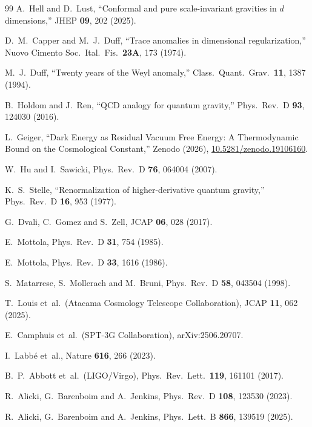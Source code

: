 \documentclass[aps,prd,twocolumn,superscriptaddress,nofootinbib]{revtex4-2}
\begin{document}
\begin{thebibliography}{99}
A.~Hell and D.~Lust,
``Conformal and pure scale-invariant gravities in $d$ dimensions,''
JHEP \textbf{09}, 202 (2025).

D.~M.~Capper and M.~J.~Duff,
``Trace anomalies in dimensional regularization,''
Nuovo Cimento Soc.\ Ital.\ Fis.\ \textbf{23A}, 173 (1974).

M.~J.~Duff,
``Twenty years of the Weyl anomaly,''
Class.\ Quant.\ Grav.\ \textbf{11}, 1387 (1994).

B.~Holdom and J.~Ren,
``QCD analogy for quantum gravity,''
Phys.\ Rev.\ D \textbf{93}, 124030 (2016).

L.~Geiger,
``Dark Energy as Residual Vacuum Free Energy: A Thermodynamic Bound on the Cosmological Constant,''
Zenodo (2026), \href{https://doi.org/10.5281/zenodo.19106160}{10.5281/zenodo.19106160}.

W.~Hu and I.~Sawicki,
Phys.\ Rev.\ D \textbf{76}, 064004 (2007).

K.~S.~Stelle,
``Renormalization of higher-derivative quantum gravity,''
Phys.\ Rev.\ D \textbf{16}, 953 (1977).

G.~Dvali, C.~Gomez and S.~Zell,
JCAP \textbf{06}, 028 (2017).

E.~Mottola,
Phys.\ Rev.\ D \textbf{31}, 754 (1985).

E.~Mottola,
Phys.\ Rev.\ D \textbf{33}, 1616 (1986).

S.~Matarrese, S.~Mollerach and M.~Bruni,
Phys.\ Rev.\ D \textbf{58}, 043504 (1998).

T.~Louis et~al.\ (Atacama Cosmology Telescope Collaboration),
JCAP \textbf{11}, 062 (2025).

E.~Camphuis et~al.\ (SPT-3G Collaboration),
arXiv:2506.20707.

I.~Labb\'e et~al.,
Nature \textbf{616}, 266 (2023).

B.~P.~Abbott et~al.\ (LIGO/Virgo),
Phys.\ Rev.\ Lett.\ \textbf{119}, 161101 (2017).

R.~Alicki, G.~Barenboim and A.~Jenkins,
Phys.\ Rev.\ D \textbf{108}, 123530 (2023).

R.~Alicki, G.~Barenboim and A.~Jenkins,
Phys.\ Lett.\ B \textbf{866}, 139519 (2025).


\end{thebibliography}
\end{document}
